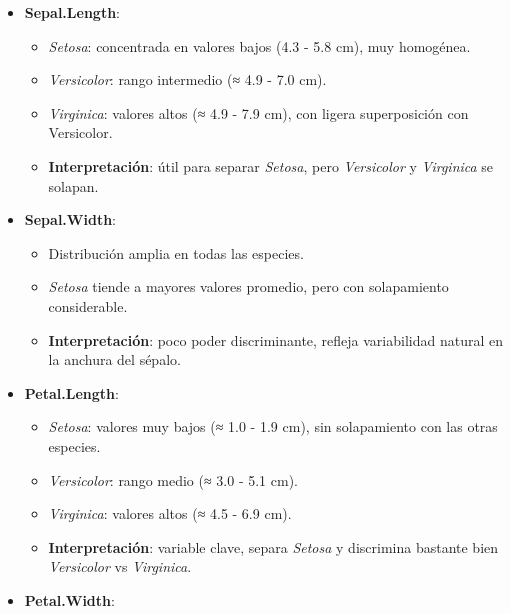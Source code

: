 \documentclass[
  spanish,
  11pt,
  a4paper,
  DIV=11,
  numbers=noendperiod]{scrartcl}
\providecommand{\tightlist}{%
  \setlength{\itemsep}{0pt}\setlength{\parskip}{0pt}}
\begin{document}
\begin{itemize}
\tightlist
\item
  \textbf{Sepal.Length}:

  \begin{itemize}
  \tightlist
  \item
    \emph{Setosa}: concentrada en valores bajos (4.3 - 5.8 cm), muy
    homogénea.\\
  \item
    \emph{Versicolor}: rango intermedio (≈ 4.9 - 7.0 cm).\\
  \item
    \emph{Virginica}: valores altos (≈ 4.9 - 7.9 cm), con ligera
    superposición con Versicolor.\\
  \item
    \textbf{Interpretación}: útil para separar \emph{Setosa}, pero
    \emph{Versicolor} y \emph{Virginica} se solapan.
  \end{itemize}
\item
  \textbf{Sepal.Width}:

  \begin{itemize}
  \tightlist
  \item
    Distribución amplia en todas las especies.\\
  \item
    \emph{Setosa} tiende a mayores valores promedio, pero con
    solapamiento considerable.\\
  \item
    \textbf{Interpretación}: poco poder discriminante, refleja
    variabilidad natural en la anchura del sépalo.
  \end{itemize}
\item
  \textbf{Petal.Length}:

  \begin{itemize}
  \tightlist
  \item
    \emph{Setosa}: valores muy bajos (≈ 1.0 - 1.9 cm), sin solapamiento
    con las otras especies.\\
  \item
    \emph{Versicolor}: rango medio (≈ 3.0 - 5.1 cm).\\
  \item
    \emph{Virginica}: valores altos (≈ 4.5 - 6.9 cm).\\
  \item
    \textbf{Interpretación}: variable clave, separa \emph{Setosa} y
    discrimina bastante bien \emph{Versicolor} vs \emph{Virginica}.
  \end{itemize}
\item
  \textbf{Petal.Width}:


\end{itemize}
\end{document}
